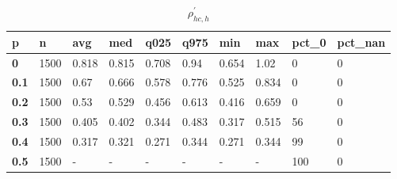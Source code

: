 \begin{table}[h]
 \centering 
\footnotesize
\caption{$\rho_{hc,h}^\prime $}
\label{tab:alphahch}
\begin{tabular}[h]{|l|l|l|l|l|l|l|l|l|l|
    } \hline
\textbf{ p} & \textbf{ n} & \textbf{ avg} & \textbf{ med} & \textbf{ q025} & \textbf{ q975} & \textbf{ min} & \textbf{ max} & \textbf{ pct\_0} & \textbf{ pct\_nan}
    \\ \hline
  \textbf{  0} & 1500 & 0.818 & 0.815 & 0.708 &  0.94 & 0.654 &  1.02 &   0 & 0
    \\ \hline
  \textbf{0.1} & 1500 &  0.67 & 0.666 & 0.578 & 0.776 & 0.525 & 0.834 &   0 & 0
    \\ \hline
  \textbf{0.2} & 1500 &  0.53 & 0.529 & 0.456 & 0.613 & 0.416 & 0.659 &   0 & 0
    \\ \hline
  \textbf{0.3} & 1500 & 0.405 & 0.402 & 0.344 & 0.483 & 0.317 & 0.515 &  56 & 0
    \\ \hline
  \textbf{0.4} & 1500 & 0.317 & 0.321 & 0.271 & 0.344 & 0.271 & 0.344 &  99 & 0
    \\ \hline
  \textbf{0.5} & 1500 & - & - & - & - & - & - & 100 & 0
    \\ \hline
 \end{tabular}
 \end{table}
